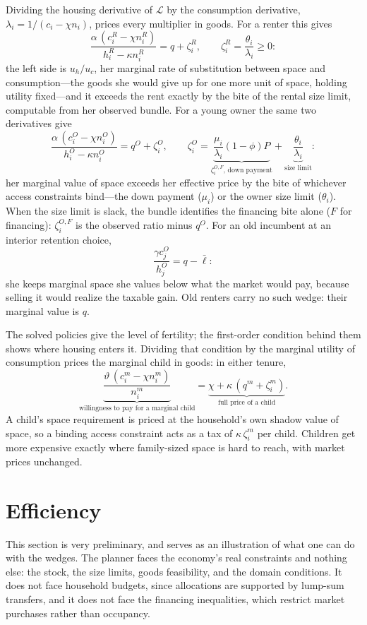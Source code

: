 \documentclass[11pt]{article}
\begin{document}
Dividing the housing derivative of $\mathcal L$ by the consumption derivative, $\lambda_i=1/(c_i-\chi n_i)$, prices every multiplier in goods. For a renter this gives
\[
\frac{\alpha\,(c_i^R-\chi n_i^R)}{h_i^R-\kappa n_i^R}=q+\zeta_i^R,
\qquad
\zeta_i^R=\frac{\theta_i}{\lambda_i}\ge0 :
\]
the left side is $u_h/u_c$, her marginal rate of substitution between space and consumption---the goods she would give up for one more unit of space, holding utility fixed---and it exceeds the rent exactly by the bite of the rental size limit, computable from her observed bundle. For a young owner the same two derivatives give
\[
\frac{\alpha\,(c_i^O-\chi n_i^O)}{h_i^O-\kappa n_i^O}=q^O+\zeta_i^O,
\qquad
\zeta_i^O=\underbrace{\frac{\mu_i}{\lambda_i}(1-\phi)P}_{\zeta_i^{O,F}\text{, down payment}}+\underbrace{\frac{\theta_i}{\lambda_i}}_{\text{size limit}} :
\]
her marginal value of space exceeds her effective price by the bite of whichever access constraints bind---the down payment ($\mu_i$) or the owner size limit ($\theta_i$). When the size limit is slack, the bundle identifies the financing bite alone ($F$ for financing): $\zeta_i^{O,F}$ is the observed ratio minus $q^O$. For an old incumbent at an interior retention choice,
\[
\frac{\gamma c_j^O}{h_j^O}=q-\bar\ell :
\]
she keeps marginal space she values below what the market would pay, because selling it would realize the taxable gain. Old renters carry no such wedge: their marginal value is $q$.

The solved policies give the level of fertility; the first-order condition behind them shows where housing enters it. Dividing that condition by the marginal utility of consumption prices the marginal child in goods: in either tenure,
\[
\underbrace{\frac{\vartheta\,(c_i^m-\chi n_i^m)}{n_i^m}}_{\text{willingness to pay for a marginal child}}
=\underbrace{\chi+\kappa\,(q^m+\zeta_i^m)}_{\text{full price of a child}} .
\]
A child's space requirement is priced at the household's own shadow value of space, so a binding access constraint acts as a tax of $\kappa\,\zeta_i^m$ per child. Children get more expensive exactly where family-sized space is hard to reach, with market prices unchanged.

\section{Efficiency}
This section is very preliminary, and serves as an illustration of what one can do with the wedges. 
The planner faces the economy's real constraints and nothing else: the stock, the size limits, goods feasibility, and the domain conditions. It does not face household budgets, since allocations are supported by lump-sum transfers, and it does not face the financing inequalities, which restrict market purchases rather than occupancy.
\end{document}
